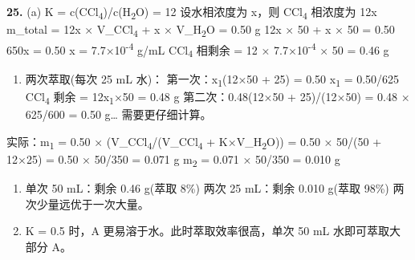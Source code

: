 \textbf{25.}
(a) K = c(CCl\textsubscript{4})/c(H\textsubscript{2}O) = 12
设水相浓度为 x，则 CCl\textsubscript{4} 相浓度为 12x
m\_total = 12x × V\_CCl\textsubscript{4} + x × V\_H\textsubscript{2}O = 0.50 g
12x × 50 + x × 50 = 0.50 \箭 650x = 0.50 \箭 x = 7.7×10\textsuperscript{-4} g/mL
CCl\textsubscript{4} 相剩余 = 12 × 7.7×10\textsuperscript{-4} × 50 = 0.46 g

\begin{enumerate}
\def\labelenumi{(\alph{enumi})}
\setcounter{enumi}{1}
\tightlist
\item
  两次萃取(每次 25 mL 水)：
  第一次：x\textsubscript{1}(12×50 + 25) = 0.50 \箭 x\textsubscript{1} = 0.50/625 \箭 CCl\textsubscript{4} 剩余 = 12x\textsubscript{1}×50 = 0.48 g
  第二次：0.48(12×50 + 25)/(12×50) = 0.48 × 625/600 = 0.50 g\ldots{} 需要更仔细计算。
\end{enumerate}

实际：m\textsubscript{1} = 0.50 × (V\_CCl\textsubscript{4}/(V\_CCl\textsubscript{4} + K×V\_H\textsubscript{2}O)) = 0.50 × 50/(50 + 12×25) = 0.50 × 50/350 = 0.071 g
m\textsubscript{2} = 0.071 × 50/350 = 0.010 g

\begin{enumerate}
\def\labelenumi{(\alph{enumi})}
\setcounter{enumi}{2}
\item
  单次 50 mL：剩余 0.46 g(萃取 8\%)
  两次 25 mL：剩余 0.010 g(萃取 98\%)
  两次少量远优于一次大量。
\item
  K = 0.5 时，A 更易溶于水。此时萃取效率很高，单次 50 mL 水即可萃取大部分 A。
\end{enumerate}

